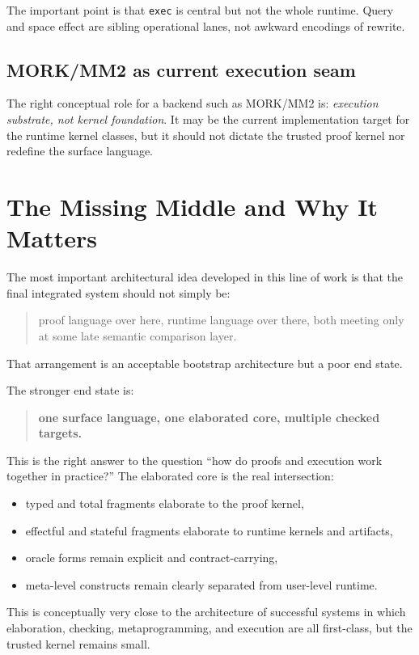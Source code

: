 \documentclass[11pt]{article}
\begin{document}
The important point is that \texttt{exec} is central but not the whole runtime. Query and space effect are sibling operational lanes, not awkward encodings of rewrite.

\subsection{MORK/MM2 as current execution seam}
The right conceptual role for a backend such as MORK/MM2 is: \emph{execution substrate, not kernel foundation}. It may be the current implementation target for the runtime kernel classes, but it should not dictate the trusted proof kernel nor redefine the surface language.

\section{The Missing Middle and Why It Matters}
The most important architectural idea developed in this line of work is that the final integrated system should not simply be:
\begin{quote}
proof language over here, runtime language over there, both meeting only at some late semantic comparison layer.
\end{quote}

That arrangement is an acceptable bootstrap architecture but a poor end state.

The stronger end state is:
\begin{quote}
\textbf{one surface language, one elaborated core, multiple checked targets.}
\end{quote}

This is the right answer to the question ``how do proofs and execution work together in practice?'' The elaborated core is the real intersection:
\begin{itemize}
  \item typed and total fragments elaborate to the proof kernel,
  \item effectful and stateful fragments elaborate to runtime kernels and artifacts,
  \item oracle forms remain explicit and contract-carrying,
  \item meta-level constructs remain clearly separated from user-level runtime.
\end{itemize}

This is conceptually very close to the architecture of successful systems in which elaboration, checking, metaprogramming, and execution are all first-class, but the trusted kernel remains small.
\end{document}

